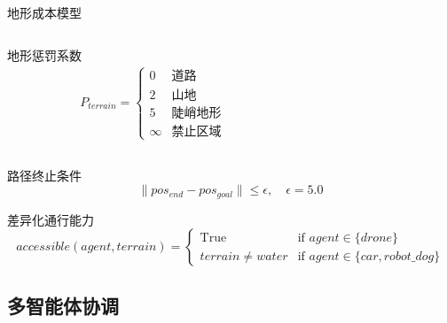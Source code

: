 \documentclass[
10pt,
aspectratio=169,
]{beamer}
\begin{document}
\begin{frame}{地形成本模型}
    \begin{columns}
        \begin{column}{0.5\textwidth}
            \begin{exampleblock}{地形惩罚系数}
                \begin{align}
                    P_{terrain} = \begin{cases}
                    0 & \text{道路} \\
                    2 & \text{山地} \\
                    5 & \text{陡峭地形} \\
                    \infty & \text{禁止区域}
                    \end{cases}
                \end{align}
            \end{exampleblock}
        \end{column}
        \begin{column}{0.5\textwidth}
           
        \end{column}
    \end{columns}
    
    \begin{exampleblock}{路径终止条件}
        \begin{equation}
            \|pos_{end} - pos_{goal}\| \leq \epsilon, \quad \epsilon = 5.0
        \end{equation}
    \end{exampleblock}


\begin{block}{差异化通行能力}
        \begin{equation}
            accessible(agent, terrain) = \begin{cases}
            \text{True} & \text{if } agent \in \{drone\} \\
            terrain \neq water & \text{if } agent \in \{car, robot\_dog\}
            \end{cases}
        \end{equation}
    \end{block}
\end{frame}
\subsection{多智能体协调}
\end{document}
